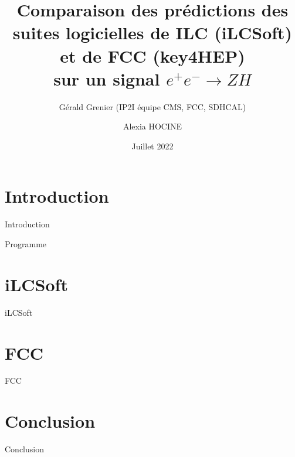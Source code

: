 \documentclass[11pt]{beamer}
\author[Hocine]{Alexia HOCINE}
\title{
	Comparaison des prédictions des suites logicielles de ILC (iLCSoft) et de FCC (key4HEP) \\
	sur un signal $ e^{+} e^{-} \longrightarrow Z H $ 
}
\subtitle{Gérald Grenier (IP2I équipe CMS, FCC, SDHCAL)}
\institute[UCBL]{Université de Claude Bernard Lyon 1}
\date[2022]{Juillet 2022}
\begin{document}

\begin{frame}
	\titlepage
\end{frame}

\section{Introduction}

\begin{frame}{Introduction}

\end{frame}


\begin{frame}{Programme}
	\tableofcontents
\end{frame}

\section{iLCSoft}

\begin{frame}{iLCSoft}

\end{frame}

\section{FCC}

\begin{frame}{FCC}

\end{frame}

\section{Conclusion}

\begin{frame}{Conclusion}


\end{frame}
\end{document}
